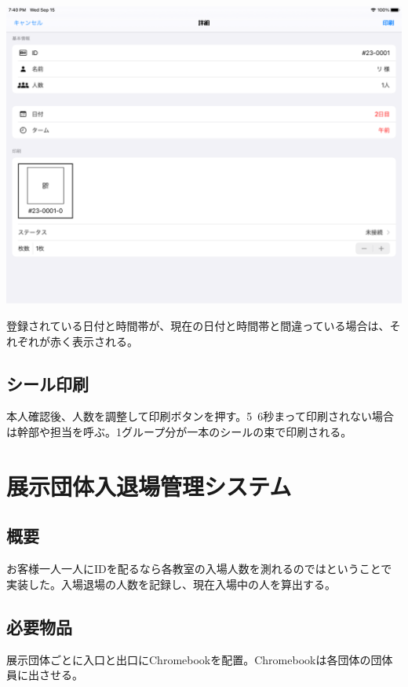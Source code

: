 \documentclass[dvipdfmx,jb5]{jreport}
\begin{document}
\begin{enumerate}
            \includegraphics[scale=0.2]{assets/entrance-system.png}
\end{enumerate}
登録されている日付と時間帯が、現在の日付と時間帯と間違っている場合は、それぞれが赤く表示される。
\subsection{シール印刷}
本人確認後、人数を調整して印刷ボタンを押す。5~6秒まって印刷されない場合は幹部や担当を呼ぶ。1グループ分が一本のシールの束で印刷される。
\section{展示団体入退場管理システム}
\subsection{概要}
お客様一人一人にIDを配るなら各教室の入場人数を測れるのではということで実装した。入場退場の人数を記録し、現在入場中の人を算出する。
\subsection{必要物品}
展示団体ごとに入口と出口にChromebookを配置。Chromebookは各団体の団体員に出させる。
\end{document}
